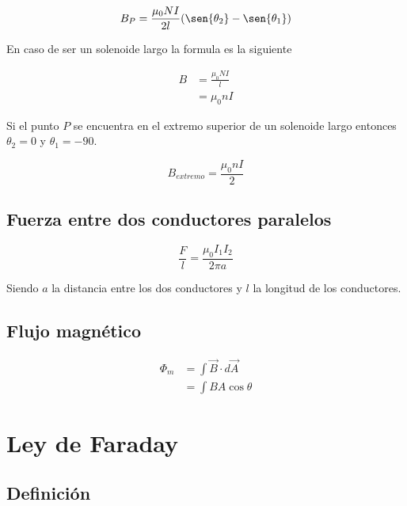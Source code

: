 \documentclass[a4, 12pt]{report}
\begin{document}
      \begin{equation*}
        B_P=\frac{\mu_0NI}{2l}(\sen{\theta_2}-\sen{\theta_1})
      \end{equation*}

      \indent En caso de ser un solenoide largo la formula es la siguiente

      \begin{align*}
        B &= \frac{\mu_0NI}{l}\\
          &= \mu_0nI
      \end{align*}

      \indent Si el punto $P$ se encuentra en el extremo superior de un solenoide
      largo entonces $\theta_2 = 0$ y $\theta_1 = -90$.

      \begin{equation*}
        B_{extremo}=\frac{\mu_0nI}{2}
      \end{equation*}


    \section*{Fuerza entre dos conductores paralelos}

      \begin{equation*}
        \frac{F}{l}=\frac{\mu_0 I_1I_2}{2\pi a}
      \end{equation*}

      \indent Siendo $a$ la distancia entre los dos conductores y $l$ la longitud
      de los conductores.

    \section*{Flujo magnético}

      \begin{align*}
        \Phi_m&=\int\vec{B}\cdot d\vec{A}\\
        &=\int BA\cos{\theta}
      \end{align*}

  \chapter*{Ley de Faraday}

    \section*{Definición}
\end{document}
